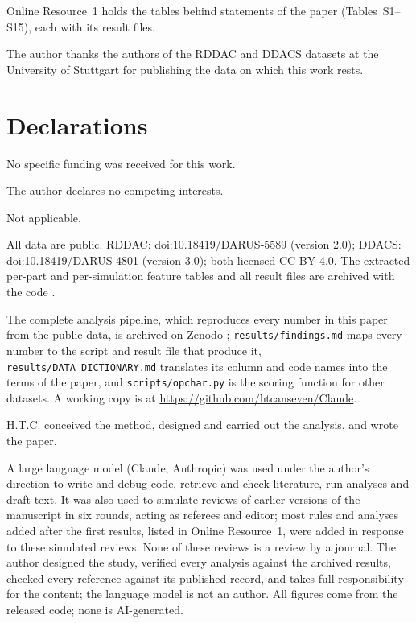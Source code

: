\documentclass[pdflatex,sn-basic,lineno]{sn-jnl}
\begin{document}
Online Resource~1 holds the tables behind statements of the paper (Tables~S1--S15), each with its result files.

The author thanks the authors of the RDDAC and DDACS datasets at the University of Stuttgart for publishing the data on which this work rests.

\section*{Declarations}

No specific funding was received for this work.

The author declares no competing interests.

Not applicable.

All data are public. RDDAC: doi:10.18419/DARUS-5589 (version 2.0); DDACS: doi:10.18419/DARUS-4801 (version 3.0); both licensed CC BY 4.0. The extracted per-part and per-simulation feature tables and all result files are archived with the code \citep{canseven2026archive}.

The complete analysis pipeline, which reproduces every number in this paper from the public data, is archived on Zenodo \citep{canseven2026archive}; \texttt{results/findings.md} maps every number to the script and result file that produce it, \texttt{results/DATA\_DICTIONARY.md} translates its column and code names into the terms of the paper, and \texttt{scripts/opchar.py} is the scoring function for other datasets. A working copy is at \url{https://github.com/htcanseven/Claude}.

H.T.C. conceived the method, designed and carried out the analysis, and wrote the paper.

A large language model (Claude, Anthropic) was used under the author's direction to write and debug code, retrieve and check literature, run analyses and draft text. It was also used to simulate reviews of earlier versions of the manuscript in six rounds, acting as referees and editor; most rules and analyses added after the first results, listed in Online Resource~1, were added in response to these simulated reviews. None of these reviews is a review by a journal. The author designed the study, verified every analysis against the archived results, checked every reference against its published record, and takes full responsibility for the content; the language model is not an author. All figures come from the released code; none is AI-generated.


\FloatBarrier
{\small
}
\end{document}
